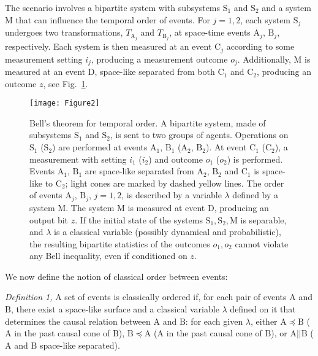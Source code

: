 \documentclass[a4paper,11pt]{article}
\begin{document}
The scenario %
involves a bipartite system with subsystems $\mathrm S_1$ and $\mathrm S_2$ and a system $\mathrm M$ that can influence the temporal order of events. For  $j=1,2$, each system $\mathrm{S}_j$ undergoes two transformations, $T_{\mathrm{A}_j}$ and $T_{\mathrm{B}_j}$, at space-time events $\mathrm A_j$, $\mathrm B_j$, respectively. Each system is then measured at an event $\mathrm C_j$ according to some measurement setting $i_j$, producing a measurement outcome $o_j$.
Additionally, $\mathrm M$ is measured at an event $\mathrm D$, space-like separated from both $\mathrm C_1$ and $\mathrm C_2$, producing an outcome $z$, see Fig.\ \ref{bell_for_time_1}.
%
\begin{figure}[h!]
\centering
\texttt{[image: Figure2]}
\caption{Bell's theorem for temporal order. A bipartite system, made of subsystems $\mathrm S_1$ and $\mathrm S_2$, is sent to two groups of agents. Operations on $\mathrm S_1$ ($\mathrm S_2$) are performed at events $\mathrm A_1$, $\mathrm B_1$ ($\mathrm A_2$, $\mathrm B_2$). At event $\mathrm C_1$ ($\mathrm C_2$), a measurement with setting $i_1$ ($i_2$) and outcome $o_1$ ($o_2$) is performed. Events $\mathrm A_1$, $\mathrm B_1$ are space-like separated from $\mathrm A_2$, $\mathrm B_2$ and $\mathrm C_1$ is space-like to $\mathrm C_2$; light cones are marked by dashed yellow lines. The order of events $\mathrm A_j$, $\mathrm B_j$, $j=1,2$, is described by a variable $\lambda$ defined by a system $\mathrm M$. The system $\mathrm M$ is measured at event $\mathrm D$, producing an output bit $z$.
If the initial state of the systems $\mathrm{S_1, S_2, M}$ is separable, and $\lambda$ is a classical variable (possibly dynamical and probabilistic),  the resulting bipartite statistics of the outcomes $o_1, o_2$ cannot violate any Bell inequality, even if conditioned on $z$.\hspace*{\fill}}
\label{bell_for_time_1}
\end{figure}
%
We now define the notion of classical order between events: %

\textit{Definition 1,} {A set of events is {classically ordered} if,
for each pair of events $\mathrm A$ and $\mathrm B$, there exist a space-like surface and a classical variable $\lambda$ defined on it that determines the causal relation between $\mathrm A$ and $\mathrm B$: for each given $\lambda$, either $\mathrm{A \preceq B}$ ($\mathrm A$ in the past causal cone of $\mathrm B$), $\mathrm{B \preceq A}$ ($\mathrm A$ in the past causal cone of $\mathrm B$), or $\mathrm{A || B}$ ($\mathrm A$ and $\mathrm B$ space-like separated).}
\end{document}
